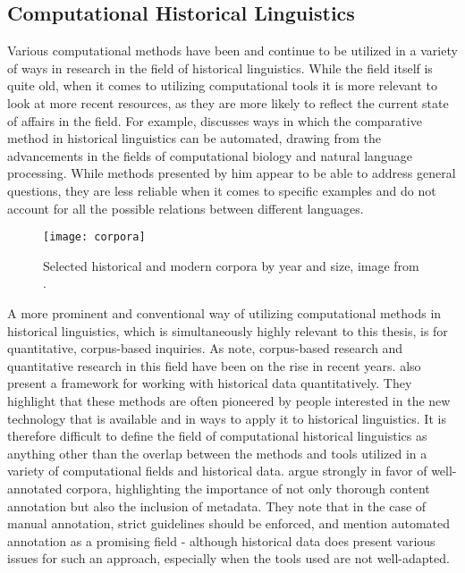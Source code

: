 \subsection{Computational Historical Linguistics}
\label{subsec:comp-hist-ling}

Various computational methods have been and continue to be utilized in a variety of ways in research in the field of historical linguistics. While the field itself is quite old, when it comes to utilizing computational tools it is more relevant to look at more recent resources, as they are more likely to reflect the current state of affairs in the field. For example, \citet{Jäger+2019+151+182} discusses ways in which the comparative method in historical linguistics can be automated, drawing from the advancements in the fields of computational biology and natural language processing. While methods presented by him appear to be able to address general questions, they are less reliable when it comes to specific examples and do not account for all the possible relations between different languages. 

\begin{figure}[h]
\centering
\texttt{[image: corpora]}
\caption{\label{fig:corpora} Selected historical and modern corpora by year and size, image from \citet{quantitative-historical}.}
\end{figure}

A more prominent and conventional way of utilizing computational methods in historical linguistics, which is simultaneously highly relevant to this thesis, is for quantitative, corpus-based inquiries. As \citet{gillivray_2023} note, corpus-based research and quantitative research in this field have been on the rise in recent years. \citet{quantitative-historical} also present a framework for working with historical data quantitatively. They highlight that these methods are often pioneered by people interested in the new technology that is available and in ways to apply it to historical linguistics. It is therefore difficult to define the field of computational historical linguistics as anything other than the overlap between the methods and tools utilized in a variety of computational fields and historical data. \citet{quantitative-historical} argue strongly in favor of well-annotated corpora, highlighting the importance of not only thorough content annotation but also the inclusion of metadata. They note that in the case of manual annotation, strict guidelines should be enforced, and mention automated annotation as a promising field - although historical data does present various issues for such an approach, especially when the tools used are not well-adapted.

